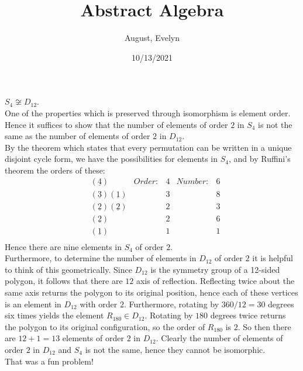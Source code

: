 \documentclass{article}
\title{Abstract Algebra}
\author{August, Evelyn}
\date{10/13/2021}
\begin{document}
\maketitle
{} $S_4 \not \cong D_{12}$.\\
 One of the properties which is preserved through isomorphism is element order. Hence it suffices to show that the number of elements of order $2$ in $S_4$ is not the same as the number of elements of order $2$ in $D_{12}$.\\
By the theorem which states that every permutation can be written in a unique disjoint cycle form, we have the possibilities for elements in $S_4$, and by Ruffini's theorem the orders of these:
$$\begin{array}{cccccc}
     & (\underline{4}) & Order:& 4 & Number: & 6 \\
     & (\underline{3})(\underline{1}) && 3 && 8 \\
     & (\underline{2})(\underline{2}) && 2 && 3 \\
     & (\underline{2})&& 2 && 6 \\
     & (\underline{1})&& 1 && 1 \\
\end{array}$$
Hence there are nine elements in $S_4$ of order $2$.\\

Furthermore, to determine the number of elements in $D_{12}$ of order $2$ it is helpful to think of this geometrically. Since $D_{12}$ is the symmetry group of a 12-sided polygon, it follows that there are $12$ axis of reflection. Reflecting twice about the same axis returns the polygon to its original position, hence each of these vertices is an element in $D_{12}$ with order $2$. Furthermore, rotating by $360/12 = 30$ degrees six times yields the element $R_{180}\in D_{12}$. Rotating by $180$ degrees twice returns the polygon to its original configuration, so the order of $R_{180}$ is $2$. So then there are $12 + 1 = 13$ elements of order $2$ in $D_{12}$. Clearly the number of elements of order $2$ in $D_{12}$ and $S_4$ is not the same, hence they cannot be isomorphic.\\

 That was a fun problem!\\
\end{document}
